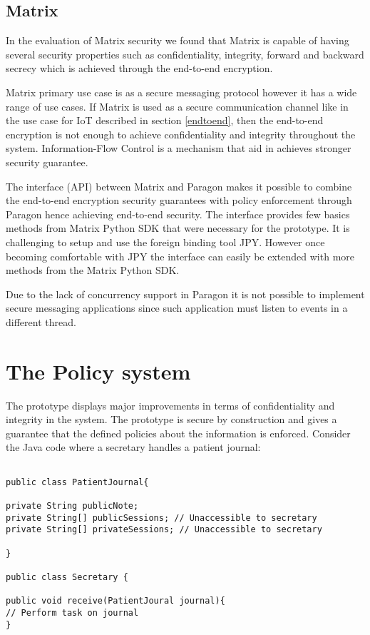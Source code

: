 \subsection{Matrix}

In the evaluation of Matrix security we found that Matrix is capable of having several security properties such as confidentiality, integrity, forward and backward secrecy which is achieved through the end-to-end encryption.

Matrix primary use case is as a secure messaging protocol however it has a wide range of use cases. If Matrix is used as a secure communication channel like in the use case for IoT described in section \ref{endtoend}, then the end-to-end encryption is not enough to achieve confidentiality and integrity throughout the system. Information-Flow Control is a mechanism that aid in achieves stronger security guarantee.

The interface (API) between Matrix and Paragon makes it possible to combine the end-to-end encryption security guarantees with policy enforcement through Paragon hence achieving end-to-end security. The interface provides few basics methods from Matrix Python SDK that were necessary for the prototype. It is challenging to setup and use the foreign binding tool JPY. However once becoming comfortable with JPY the interface can easily be extended with more methods from the Matrix Python SDK.

Due to the lack of concurrency support in Paragon it is not possible to implement secure messaging applications since such application must listen to events in a different thread.


\section{The Policy system}


The prototype displays major improvements in terms of confidentiality and integrity in the system. The prototype is secure by construction and gives a guarantee that the defined policies about the information is enforced. Consider the Java code where a secretary handles a patient journal: 

\begin{lstlisting}

public class PatientJournal{

private String publicNote;
private String[] publicSessions; // Unaccessible to secretary
private String[] privateSessions; // Unaccessible to secretary

}

public class Secretary {

public void receive(PatientJoural journal){
// Perform task on journal
}

\end{lstlisting}

